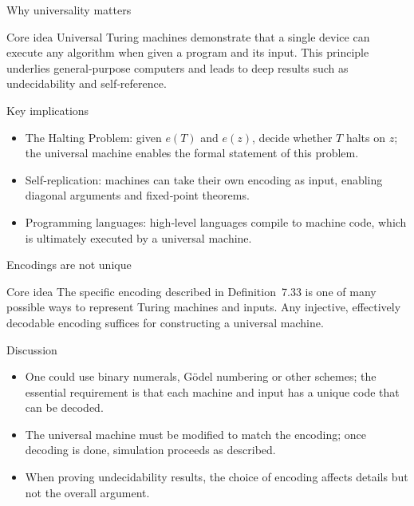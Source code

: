 \begin{frame}[t]{Why universality matters}
  \begin{tblock}{Core idea}
    Universal Turing machines demonstrate that a single device can
    execute any algorithm when given a program and its input.  This
    principle underlies general‑purpose computers and leads to deep
    results such as undecidability and self‑reference.
  \end{tblock}
  \begin{tblock}{Key implications}
    \begin{itemize}
      \item The Halting Problem: given $e(T)$ and $e(z)$, decide whether
        $T$ halts on $z$; the universal machine enables the formal
        statement of this problem.
      \item Self‑replication: machines can take their own encoding as
        input, enabling diagonal arguments and fixed‑point theorems.
      \item Programming languages: high‑level languages compile to
        machine code, which is ultimately executed by a universal
        machine.
    \end{itemize}
  \end{tblock}
  \label{fr:7.8-08}
\end{frame}

\begin{frame}[t]{Encodings are not unique}
  \begin{tblock}{Core idea}
    The specific encoding described in Definition 7.33 is one of many
    possible ways to represent Turing machines and inputs.  Any
    injective, effectively decodable encoding suffices for constructing
    a universal machine.
  \end{tblock}
  \begin{tblock}{Discussion}
    \begin{itemize}
      \item One could use binary numerals, Gödel numbering or other
        schemes; the essential requirement is that each machine and
        input has a unique code that can be decoded.
      \item The universal machine must be modified to match the
        encoding; once decoding is done, simulation proceeds as
        described.
      \item When proving undecidability results, the choice of
        encoding affects details but not the overall argument.
    \end{itemize}
  \end{tblock}
  \label{fr:7.8-09}
\end{frame}


